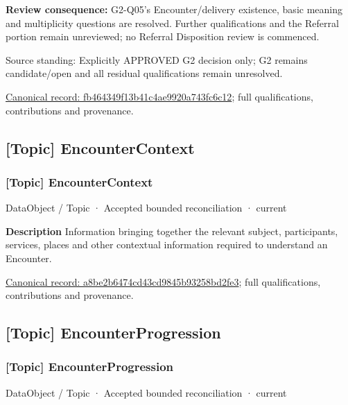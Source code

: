 \textbf{Review consequence:} G2-Q05's Encounter/delivery existence, basic meaning and multiplicity questions are resolved. Further qualifications and the Referral portion remain unreviewed; no Referral Disposition review is commenced.



Source standing: Explicitly APPROVED G2 decision only; G2 remains candidate/open and all residual qualifications remain unresolved.


{\footnotesize \href{../../../../continuum/application/data-object/topic/fb464349f13b41c4ae9920a743fc6c12.md}{Canonical record: fb464349f13b41c4ae9920a743fc6c12}; full qualifications, contributions and provenance.}\par
\subsection{[Topic] EncounterContext}

\subsubsection{[Topic] EncounterContext}

\label{element:a8be2b6474cd43cd9845b93258bd2fe3}
{\small DataObject / Topic · Accepted bounded reconciliation · current}\par

\textbf{Description}
Information bringing together the relevant subject, participants, services, places and other contextual information required to understand an Encounter.


{\footnotesize \href{../../../../continuum/application/data-object/topic/a8be2b6474cd43cd9845b93258bd2fe3.md}{Canonical record: a8be2b6474cd43cd9845b93258bd2fe3}; full qualifications, contributions and provenance.}\par
\subsection{[Topic] EncounterProgression}

\subsubsection{[Topic] EncounterProgression}

\label{element:a3badcf73eaa4331b75d7b3eb6e67fc8}
{\small DataObject / Topic · Accepted bounded reconciliation · current}\par

